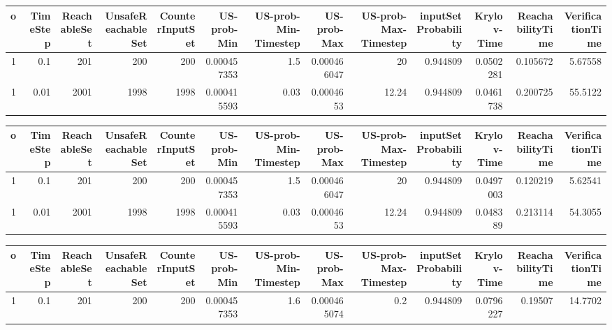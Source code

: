 \begin{tabular}{rrrrrrrrrrrrr}
\hline
   o &   TimeStep &   ReachableSet &   UnsafeReachableSet &   CounterInputSet &   US-prob-Min &   US-prob-Min-Timestep &   US-prob-Max &   US-prob-Max-Timestep &   inputSet Probability &   Krylov-Time &   ReachabilityTime &   VerificationTime \\
\hline
   1 &       0.1  &            201 &                  200 &               200 &   0.000457353 &                   1.5  &   0.000466047 &                  20    &               0.944809 &     0.0502281 &           0.105672 &            5.67558 \\
   1 &       0.01 &           2001 &                 1998 &              1998 &   0.000415593 &                   0.03 &   0.0004653   &                  12.24 &               0.944809 &     0.0461738 &           0.200725 &           55.5122  \\
\hline
\end{tabular}
\begin{tabular}{rrrrrrrrrrrrr}
\hline
   o &   TimeStep &   ReachableSet &   UnsafeReachableSet &   CounterInputSet &   US-prob-Min &   US-prob-Min-Timestep &   US-prob-Max &   US-prob-Max-Timestep &   inputSet Probability &   Krylov-Time &   ReachabilityTime &   VerificationTime \\
\hline
   1 &       0.1  &            201 &                  200 &               200 &   0.000457353 &                   1.5  &   0.000466047 &                  20    &               0.944809 &     0.0497003 &           0.120219 &            5.62541 \\
   1 &       0.01 &           2001 &                 1998 &              1998 &   0.000415593 &                   0.03 &   0.0004653   &                  12.24 &               0.944809 &     0.048389  &           0.213114 &           54.3055  \\
\hline
\end{tabular}
\begin{tabular}{rrrrrrrrrrrrr}
\hline
   o &   TimeStep &   ReachableSet &   UnsafeReachableSet &   CounterInputSet &   US-prob-Min &   US-prob-Min-Timestep &   US-prob-Max &   US-prob-Max-Timestep &   inputSet Probability &   Krylov-Time &   ReachabilityTime &   VerificationTime \\
\hline
   1 &        0.1 &            201 &                  200 &               200 &   0.000457353 &                    1.6 &   0.000465074 &                    0.2 &               0.944809 &     0.0796227 &            0.19507 &            14.7702 \\
\hline
\end{tabular}
